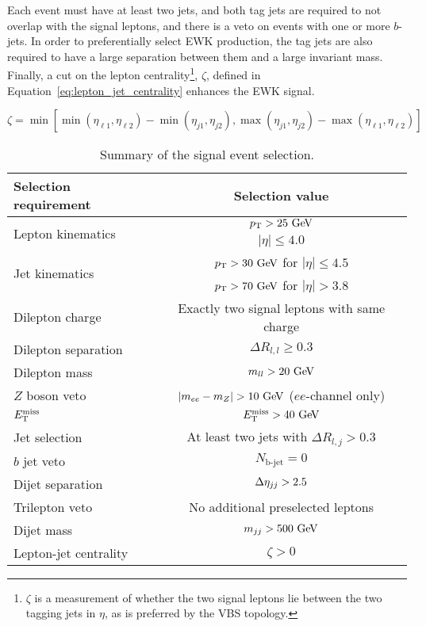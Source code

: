Each event must have at least two jets, and both tag jets are required to not overlap with the signal leptons, and there is a veto on events with one or more $b$-jets.
In order to preferentially select EWK production, the tag jets are also required to have a large separation between them and a large invariant mass.
Finally, a cut on the lepton centrality\footnote{$\zeta$ is a measurement of whether the two signal leptons lie between the two tagging jets in $\eta$, as is preferred by the VBS topology.}, $\zeta$, defined in Equation~\ref{eq:lepton_jet_centrality} enhances the EWK \ssww signal.

\begin{equation}
\zeta = \min [\min (\eta_{\ell1}, \eta_{\ell2} )-\min(\eta_{j1},\eta_{j2}), \max(\eta_{j1},\eta_{j2})-\max(\eta_{\ell1},\eta_{\ell2}) ]
\label{eq:lepton_jet_centrality}
\end{equation}

\begin{table}[htbp]
  \centering
  \begin{tabular}{l|c}
    Selection requirement              & Selection value \\
    \hline\hline
    \multirow{2}{*}{Lepton kinematics} & $\pt > 25\gev$ \\
                                       & $|\eta| \le 4.0$ \\
    \multirow{2}{*}{Jet kinematics}    & $\pt > 30\gev$ for $|\eta| \le 4.5$ \\
                                       & $\pt > 70\gev$ for $|\eta| > 3.8$ \\
    \hline
    Dilepton charge                    & Exactly two signal leptons with same charge\\
    Dilepton separation                & $\Delta R_{l,l} \ge 0.3$ \\
    Dilepton mass                      & $m_{ll} > 20\gev$\\
    $Z$ boson veto                     & $|m_{ee} - m_Z| > 10\gev$ ($ee$-channel only) \\
    $E_{\mathrm{T}}^{\mathrm{miss}}$                             & $\met > 40\gev$ \\
    Jet selection                      & At least two jets with $\Delta R_{l,j} > 0.3$\\
    $b$ jet veto                       & $N_{\textrm{b-jet}} = 0$\\
    Dijet separation                   & $\detajj > 2.5$\\
    Trilepton veto                     & No additional preselected leptons\\
    Dijet mass                         & $m_{jj} > 500\gev$\\
    Lepton-jet centrality              & $\zeta > 0$\\
    \hline
  \end{tabular}
  \caption{Summary of the signal event selection.}
  \label{tab:sswwupgrade_event_selection}
\end{table}
